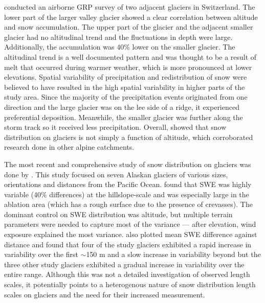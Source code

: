 \documentclass{sfuthesis}
\begin{document}
\cite{Machguth2006} conducted an airborne GRP survey of two adjacent glaciers in Switzerland. The lower part of the larger valley glacier showed a clear correlation between altitude and snow accumulation. The upper part of the glacier and the adjacent smaller glacier had no altitudinal trend and the fluctuations in depth were large. Additionally, the accumulation was 40$\%$ lower on the smaller glacier. The altitudinal trend is a well documented pattern and was thought to be a result of melt that occurred during warmer weather, which is more pronounced at lower elevations. Spatial variability of precipitation and redistribution of snow were believed to have resulted in the high spatial variability in higher parts of the study area. Since the majority of the precipitation events originated from one direction and the large glacier was on the lee side of a ridge, it experienced preferential deposition. Meanwhile, the smaller glacier was further along the storm track so it received less precipitation. Overall, \cite{Machguth2006} showed that snow distribution on glaciers is not simply a function of altitude, which corroborated research done in other alpine catchments.

The most recent and comprehensive study of snow distribution on glaciers was done by \cite{McGrath2015}. This study focused on seven Alaskan glaciers of various sizes, orientations and distances from the Pacific Ocean. \cite{McGrath2015} found that SWE was highly variable (40$\%$ differences) at the hillslope-scale and was especially large in the ablation area (which has a rough surface due to the presence of crevasses). The dominant control on SWE distribution was altitude, but multiple terrain parameters were needed to capture most of the variance --- after elevation, wind exposure explained the most variance. \cite{McGrath2015} also plotted mean SWE difference against distance and found that four of the study glaciers exhibited a rapid increase in variability over the first $\sim$150 m and a slow increase in variability beyond but the three other study glaciers exhibited a gradual increase in variability over the entire range. Although this was not a detailed investigation of observed length scales, it potentially points to a heterogenous nature of snow distribution length scales on glaciers and the need for their increased measurement.
\end{document}
